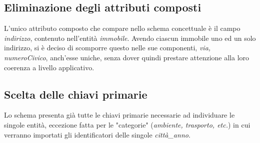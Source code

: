 \documentclass[a4paper,12pt]{report}
\begin{document}
            \subsection*{Eliminazione degli attributi composti}
            L'unico attributo composto che compare nello schema concettuale è il campo \textit{indirizzo},
            contenuto nell'entità \textit{immobile}. Avendo ciascun immobile uno ed un solo indirizzo,
            si è deciso di scomporre questo nelle sue componenti, \textit{via, numeroCivico}, anch'esse uniche, senza dover quindi 
            prestare attenzione alla loro coerenza a livello applicativo.

            \subsection*{Scelta delle chiavi primarie}
            Lo schema presenta già tutte le chiavi primarie necessarie ad individuare le singole entità, eccezione fatta
            per le "categorie" (\textit{ambiente, trasporto, etc.}) in cui verranno importati gli identificatori delle 
            singole \textit{città\_anno}.
\end{document}
